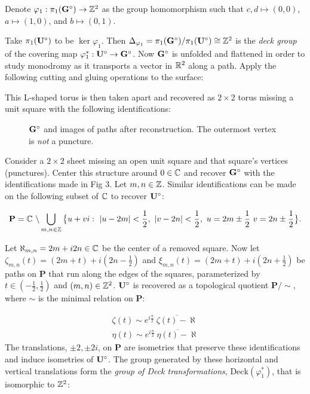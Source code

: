 \documentclass[]{article}
\begin{document}
\begin{Def}
Denote $\varphi_1:\pi_1(\mathbf{G}^\circ)\rightarrow \mathbb{Z}^2$ as the group homomorphism such that $c,d\mapsto(0,0)$, $a\mapsto(1,0)$, and $b\mapsto(0,1)$.
\end{Def}

Take $\pi_1(\mathbf{U}^\circ)$ to be $\ker\varphi_1$. Then $\Delta_{\varphi_1}=\pi_1(\mathbf{G}^\circ)/\pi_1(\mathbf{U}^\circ)\cong\mathbb{Z}^2$ is the \emph{deck group} of the covering map $\varphi_1^*:\mathbf{U}^\circ\rightarrow\mathbf{G}^\circ$. Now $\mathbf{G}^\circ$ is unfolded and flattened in order to study monodromy as it transports a vector in $\mathbb{R}^2$ along a path. Apply the following cutting and gluing operations to the surface: \\
\begin{figure}[H]
\centering

\end{figure}
\noindent This L-shaped torus is then taken apart and recovered as $2\times 2$ torus missing a unit square with the following identifications:\\
\begin{figure}[H]
\centering

\caption{$\mathbf{G}^\circ$ and images of paths after reconstruction. The outermost vertex is \emph{not} a puncture.}
\end{figure}

Consider a $2\times2$ sheet missing an open unit square and that square's vertices (punctures). Center this structure around $0\in\mathbb{C}$ and recover $\mathbf{G}^\circ$ with the identifications made in Fig 3. Let $m,n\in\mathbb{Z}$. Similar identifications can be made on the following subset of $\mathbb{C}$ to recover $\mathbf{U}^\circ$:

\begin{equation}
\label{eq:P}
\mathbf{P} = \mathbb{C}\text{ }\backslash\bigcup_{m,n \in {\mathbb Z}} \big{\{} u+vi:~|u-2m|<\frac{1}{2},~|v-2n|<\frac{1}{2},~u=2m\pm\frac{1}{2}~v=2n\pm\frac{1}{2} \big{\}}.
\end{equation}

\noindent Let $\aleph_{m,n}=2m+i2n\in\mathbb{C}$ be the center of a removed square. Now let $\zeta_{m,n}(t)=(2m+t)+i(2n-\frac{1}{2})$ and 
$\xi_{m,n}(t)=(2m+t)+i(2n+\frac{1}{2})$ be paths on $\mathbf{P}$ that run along the edges of the squares, parameterized by $t\in (-\frac{1}{2},\frac{1}{2})$ and $(m,n)\in\mathbb{Z}^2$. $\mathbf{U}^\circ$ is recovered as a topological quotient $\mathbf{P}/\sim$, where $\sim$ is the minimal relation on $\mathbf{P}$:

\begin{equation}
\begin{split}
\zeta(t)\sim e^{i\frac{\pi}{2}}~\overline{\zeta(t)-\aleph}\\
\eta(t)\sim e^{i\frac{\pi}{2}}~\overline{\eta(t)-\aleph}
\label{eq:rel2}
\end{split}
\end{equation}
The translations, $\pm 2,\pm 2i$, on $\mathbf{P}$ are isometries that preserve these identifications and induce isometries of $\mathbf{U}^\circ$. The group generated by these horizontal and vertical translations form the \emph{group of Deck transformations}, $\text{Deck}(\varphi_1^*)$, that  is isomorphic to $\mathbb{Z}^2$:
\end{document}

